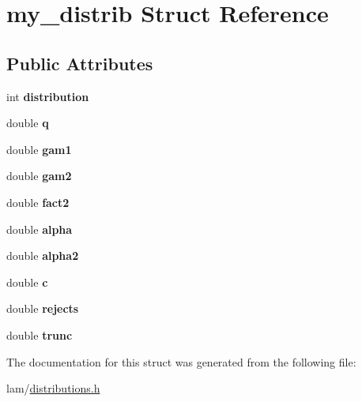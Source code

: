 \hypertarget{structmy__distrib}{
\section{my\_\-distrib Struct Reference}
\label{structmy__distrib}
}
\subsection*{Public Attributes}
\begin{DoxyCompactItemize}
\item 
\hypertarget{structmy__distrib_a26e9c29672f1296887d5f0cee489d01c}{
int {\bfseries distribution}}
\label{structmy__distrib_a26e9c29672f1296887d5f0cee489d01c}

\item 
\hypertarget{structmy__distrib_a09db1e6c3fd500a166d506eab9ef0b90}{
double {\bfseries q}}
\label{structmy__distrib_a09db1e6c3fd500a166d506eab9ef0b90}

\item 
\hypertarget{structmy__distrib_ae015e5df44b646cd92ef3ef913e33c84}{
double {\bfseries gam1}}
\label{structmy__distrib_ae015e5df44b646cd92ef3ef913e33c84}

\item 
\hypertarget{structmy__distrib_ad9b00b25e03954ed3497d20fcd20ce2d}{
double {\bfseries gam2}}
\label{structmy__distrib_ad9b00b25e03954ed3497d20fcd20ce2d}

\item 
\hypertarget{structmy__distrib_a685ed7df67bf8c0825bd35f77599600b}{
double {\bfseries fact2}}
\label{structmy__distrib_a685ed7df67bf8c0825bd35f77599600b}

\item 
\hypertarget{structmy__distrib_a6c4c10e3fdeac576652153a6b35952d0}{
double {\bfseries alpha}}
\label{structmy__distrib_a6c4c10e3fdeac576652153a6b35952d0}

\item 
\hypertarget{structmy__distrib_aa06e06cb6e8ebc19a9801c13348da080}{
double {\bfseries alpha2}}
\label{structmy__distrib_aa06e06cb6e8ebc19a9801c13348da080}

\item 
\hypertarget{structmy__distrib_a88b6d60a6c63f9b7e3e5a524292ef22e}{
double {\bfseries c}}
\label{structmy__distrib_a88b6d60a6c63f9b7e3e5a524292ef22e}

\item 
\hypertarget{structmy__distrib_ac44e058c962f4b028404770130697b51}{
double {\bfseries rejects}}
\label{structmy__distrib_ac44e058c962f4b028404770130697b51}

\item 
\hypertarget{structmy__distrib_aa4d7e6756705fa51641988ad50a6291a}{
double {\bfseries trunc}}
\label{structmy__distrib_aa4d7e6756705fa51641988ad50a6291a}

\end{DoxyCompactItemize}


The documentation for this struct was generated from the following file:\begin{DoxyCompactItemize}
\item 
lam/\hyperlink{distributions_8h}{distributions.h}\end{DoxyCompactItemize}
